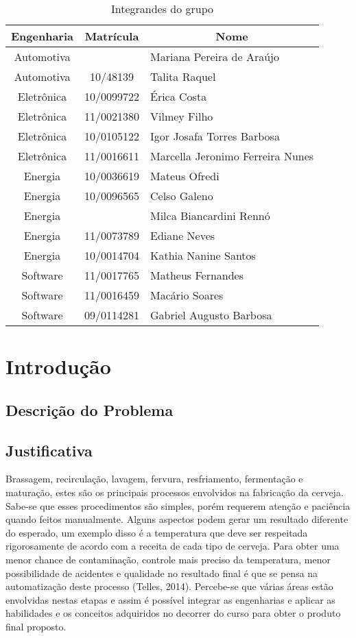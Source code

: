\begin{table}[]
\centering
\caption{Integrandes do grupo}
\begin{tabular}{|c|c|l|}
\hline
{\bf Engenharia} & {\bf Matrícula} & \multicolumn{1}{c|}{{\bf Nome}} \\ \hline
Automotiva &      & Mariana Pereira  de Araújo \\ \hline
Automotiva &  10/48139 &    Talita Raquel \\ \hline
Eletrônica &  10/0099722 &  Érica Costa \\ \hline
Eletrônica &  11/0021380 &  Vilmey Filho \\ \hline
Eletrônica &  10/0105122 &  Igor Josafa Torres Barbosa \\ \hline
Eletrônica &  11/0016611 &  Marcella Jeronimo Ferreira Nunes \\ \hline
Energia & 10/0036619 &  Mateus Ofredi \\ \hline
Energia & 10/0096565 &  Celso Galeno \\ \hline
Energia &     & Milca Biancardini Rennó \\ \hline
Energia & 11/0073789 &  Ediane Neves \\ \hline
Energia & 10/0014704 &  Kathia Nanine Santos \\ \hline
Software &    11/0017765 &  Matheus Fernandes \\ \hline
Software &    11/0016459 &  Macário Soares \\ \hline
Software &    09/0114281 &  Gabriel Augusto Barbosa \\ \hline
\end{tabular}
\end{table}


\clearpage
\section{Introdução}
    \subsection{Descrição do Problema}

    \subsection{Justificativa}
    Brassagem, recirculação, lavagem, fervura, resfriamento, fermentação e maturação, estes são os principais processos envolvidos na fabricação da cerveja. Sabe-se que esses procedimentos são simples, porém requerem atenção e paciência quando feitos manualmente. Alguns aspectos podem gerar um resultado diferente do esperado, um exemplo disso é a temperatura que deve ser respeitada rigorosamente de acordo com a receita de cada tipo de cerveja. Para obter uma menor chance de contaminação, controle mais preciso da temperatura, menor possibilidade de acidentes e qualidade no resultado final é que se pensa na automatização deste processo (Telles, 2014).  Percebe-se que várias áreas estão envolvidas nestas etapas e assim é possível integrar as engenharias e aplicar as habilidades e os conceitos adquiridos no decorrer do curso para obter o produto final proposto.

